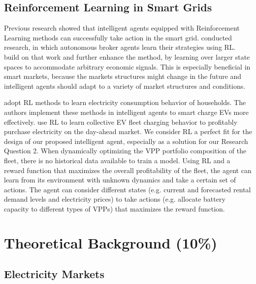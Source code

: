 \documentclass[12pt, article]{article}
\begin{document}
\subsection{Reinforcement Learning in Smart Grids}
\label{sec:orgcec771d}

Previous research showed that intelligent agents equipped with Reinforcement
Learning methods can successfully take action in the smart grid.
\textcite{reddy11_strat,reddy11_learn_behav_multip_auton_agent} conducted
research, in which autonomous broker agents \parencite{ketter13_power_tac} learn
their strategies using RL. \textcite{peters13_reinf_learn_approac_to_auton} build
on that work and further enhance the method, by learning over larger state
spaces to accommodate arbitrary economic signals. This is especially beneficial
in smart markets, because the markets structures might change in the future and
intelligent agents should adapt to a variety of market structures and
conditions.

\parencite{vazquez-canteli19_reinf_learn_deman_respon}


\textcite{valogianni14_effec_manag_elect_vehic_storag} adopt RL methods to learn
electricity consumption behavior of households. The authors implement these
methods in intelligent agents to smart charge EVs more effectively.
\textcite{vandael15_reinf_learn_heuris_ev_fleet} use RL to learn collective EV
fleet charging behavior to profitably purchase electricity on the day-ahead
market. We consider RL a perfect fit for the design of our proposed intelligent
agent, especially as a solution for our Research Question 2. When dynamically
optimizing the VPP portfolio composition of the fleet, there is no historical
data available to train a model. Using RL and a reward function that maximizes
the overall profitability of the fleet, the agent can learn from its environment
with unknown dynamics and take a certain set of actions. The agent can consider
different states (e.g. current and forecasted rental demand levels and
electricity prices) to take actions (e.g. allocate battery capacity to different
types of VPPs) that maximizes the reward function.

\section{Theoretical Background (10\%)}
\label{sec:org3ba4f7e}
\subsection{Electricity Markets}
\label{sec:org86c1313}
\end{document}

